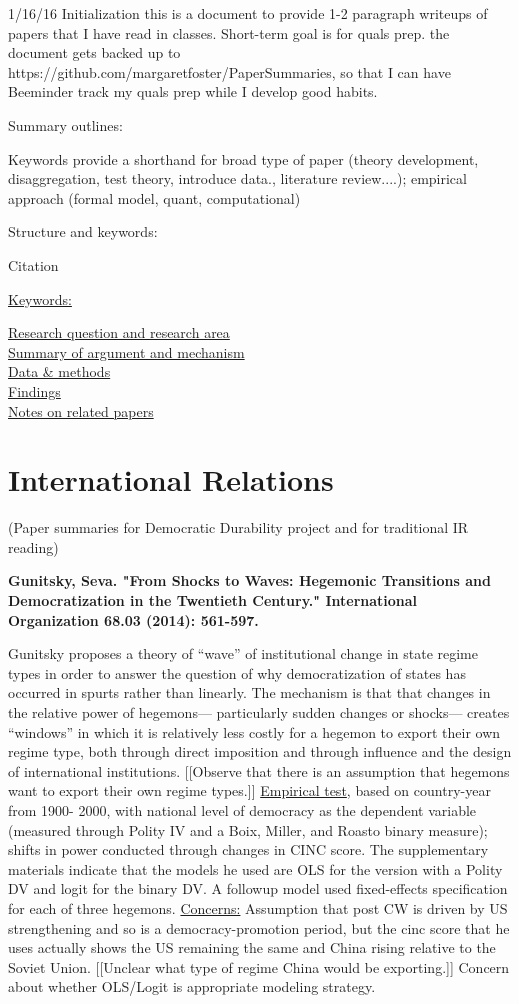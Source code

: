 \documentclass{article}[12pt]
\begin{document}
1/16/16 Initialization
this is a document to provide 1-2 paragraph writeups of papers that I have read in classes. Short-term goal is for quals prep.
the document gets backed up to \\
https://github.com/margaretfoster/PaperSummaries, so that I can have Beeminder track my quals prep 
while I develop good habits.

Summary outlines:

Keywords provide a shorthand for broad type of paper (theory development, disaggregation, test theory, introduce data., literature review....); empirical approach (formal model, quant, computational)

Structure and keywords:

Citation

\underline{Keywords:}

\underline{Research question and research area}\\
\underline{Summary of argument and mechanism}\\
\underline{Data \& methods}\\
\underline{Findings}\\
\underline{Notes on related papers}\\



\section{International Relations}
(Paper summaries for Democratic Durability project and for traditional IR reading)


\textbf{Gunitsky, Seva. "From Shocks to Waves: Hegemonic Transitions and Democratization in the Twentieth Century." International Organization 68.03 (2014): 561-597.}

Gunitsky proposes a theory of “wave” of institutional change in state regime types in order to answer the question of why democratization of states has occurred in spurts rather than linearly. The mechanism is that that changes in the relative power of hegemons— particularly sudden changes or shocks— creates “windows” in which it is relatively less costly for a hegemon to export their own regime type, both through direct imposition and through influence and the design of international institutions. [[Observe that there is an assumption that hegemons want to export their own regime types.]]
\underline{Empirical test}, based on country-year from 1900- 2000, with national level of democracy as the dependent variable (measured through Polity IV and a Boix, Miller, and Roasto binary measure); shifts in power conducted through changes in CINC score. The supplementary materials indicate that the models he used are OLS for the version with a Polity DV and logit for the binary DV.  A followup model used fixed-effects specification for each of three hegemons.
\underline{Concerns:} Assumption that post CW is driven by US strengthening and so is a democracy-promotion period, but the cinc score that he uses actually shows the US remaining the same and China rising relative to the Soviet Union. [[Unclear what type of regime China would be exporting.]] Concern about whether OLS/Logit is appropriate modeling strategy.
\end{document}
